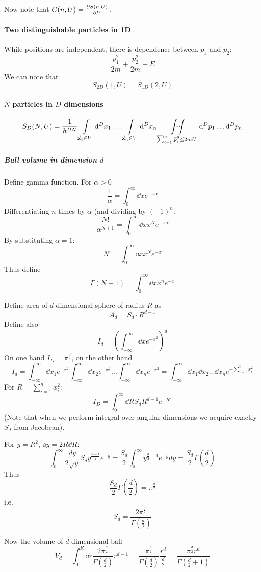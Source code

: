 Now note that $G(n, U) = \pdv{S(n,U)}{U}$.

\paragraph{Two distinguishable particles in 1D}

While positions are independent, there is dependence between $p_1$ and $p_2$:
$$\frac{p_1^2}{2m}+\frac{p_2^2}{2m} + E$$
We can note that
$$S_{2D}(1,U) = S_{1D} (2, U)$$

\paragraph{$N$ particles in $D$ dimensions}
$$S_D(N,U) = \frac{1}{h^{DN}} \int\limits_{\va{x}_1 \in V} \dd[D]{x_1} \: \dots  \int\limits_{\va{x}_n \in V} \dd[D]{x_n}  \idotsint\limits_{\sum_{i=1}^n \va{p}_i^2 \leq 2mU} \dd[D]{p_1} \dots \dd[D]{p_n}$$

\subparagraph{Ball volume in dimension $d$}
Define gamma function. For $\alpha > 0$
$$\frac{1}{\alpha} = \int_0^\infty \dd{x} e^{-x\alpha}$$
Differentiating $n$ times by $\alpha$ (and dividing by $(-1)^n$:
$$\frac{N!}{\alpha^{N+1}} = \int_0^\infty \dd{x} x^N e^{-x\alpha}$$
By substituting $\alpha = 1$:
$$N! = \int_0^\infty \dd{x} x^N e^{-x}$$
Thus define 
$$\Gamma(N+1) = \int_0^\infty \dd{x} x^n e^{-x}$$

Define area of $d$-dimensional sphere of radius $R$ as
$$A_d = S_d \cdot R^{d-1}$$
Define also
$$I_d = \left(\int_{-\infty}^{\infty} \dd{x} e^{-x^2}\right)^d$$
On one hand $I_D = \pi^{\frac{d}{2}}$, on the other hand
$$I_d = \int_{-\infty}^{\infty} \dd{x_1}  e^{-x^2} \int_{-\infty}^{\infty} \dd{x_2}  e^{-x^2} \dots \int_{-\infty}^{\infty} \dd{x_n}  e^{-x^2} = \int_{-\infty}^{\infty} \dd{x_1}\dd{x_2}\dots \dd{x_n}   e^{-\sum_{i=1}^n x_i^2}$$
For $R=\sum_{i=1}^n x_i^2$:
$$I_D = \int_0^\infty \dd{R} S_d R^{d-1} e^{-R^2}$$
(Note that when we perform integral over angular dimensions we acquire exactly $S_d$ from Jacobean).

For $y=R^2$, $\dd{y}=2R\dd{R}$:
$$\int_0^\infty \frac{dy}{2\sqrt{y}} S_d y^{\frac{d-1}{2}} e^{-y} = \frac{S_d}{2} \int_{0}^{\infty} y^{\frac{d}{2} -1} e^{-y} dy = \frac{S_d}{2} \Gamma\left(\frac{d}{2}\right)$$
Thus
$$\frac{S_d}{2} \Gamma\left(\frac{d}{2}\right) = \pi^{\frac{d}{2}} $$
i.e.\
$$S_d = \frac{2\pi^{\frac{d}{2}}}{\Gamma\left(\frac{d}{2}\right)}$$

Now the volume of $d$-dimensional ball
$$V_d = \int_0^R \dd{r} \frac{2\pi^{\frac{d}{2}}}{\Gamma\left(\frac{d}{2}\right)} r^{d-1}= \frac{\pi^{\frac{d}{2}}}{\Gamma\left(\frac{d}{2}\right)} \frac{r^{d}}{\frac{d}{2}}= \frac{\pi^{\frac{d}{2}}r^{d}}{\Gamma\left(\frac{d}{2}+1\right)}$$


